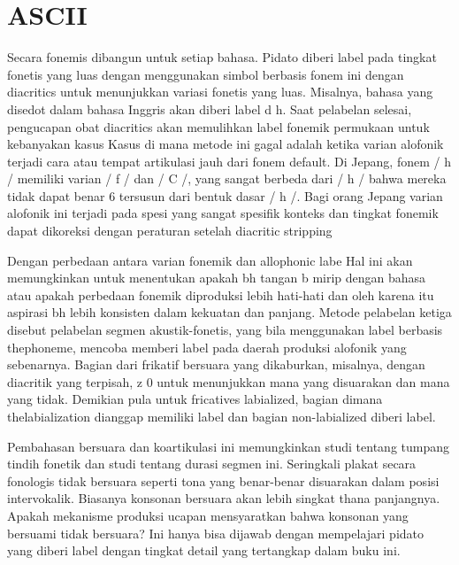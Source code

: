 \section{ASCII}
Secara fonemis dibangun untuk setiap bahasa.
Pidato diberi label pada tingkat fonetis yang luas dengan menggunakan simbol berbasis fonem ini dengan diacritics
untuk menunjukkan variasi fonetis yang luas. Misalnya, bahasa yang disedot dalam bahasa Inggris akan diberi label d h.
Saat pelabelan selesai, pengucapan obat diacritics akan memulihkan label fonemik permukaan
untuk kebanyakan kasus Kasus di mana metode ini gagal adalah ketika varian alofonik terjadi
cara atau tempat artikulasi jauh dari fonem default. Di Jepang, fonem / h /
memiliki varian / f / dan / C /, yang sangat berbeda dari / h / bahwa mereka tidak dapat benar 6
tersusun dari bentuk dasar / h /. Bagi orang Jepang varian alofonik ini terjadi pada spesi yang sangat spesifik
konteks dan tingkat fonemik dapat dikoreksi dengan peraturan setelah diacritic stripping

Dengan perbedaan antara varian fonemik dan allophonic labe Hal ini akan memungkinkan untuk menentukan apakah bh tangan b mirip dengan bahasa atau apakah perbedaan fonemik diproduksi lebih hati-hati dan oleh karena itu aspirasi bh lebih konsisten dalam kekuatan dan panjang. Metode pelabelan ketiga disebut pelabelan segmen akustik-fonetis, yang bila menggunakan label berbasis thephoneme, mencoba memberi label pada daerah produksi alofonik yang sebenarnya. Bagian dari frikatif bersuara yang dikaburkan, misalnya, dengan diacritik yang terpisah, z 0 untuk menunjukkan mana yang disuarakan dan mana yang tidak. Demikian pula untuk fricatives labialized, bagian dimana thelabialization dianggap memiliki label dan bagian non-labialized diberi label. 

Pembahasan bersuara dan koartikulasi ini memungkinkan studi tentang tumpang tindih fonetik dan studi tentang durasi segmen ini. Seringkali plakat secara fonologis tidak bersuara seperti tona yang benar-benar disuarakan dalam posisi intervokalik. Biasanya konsonan bersuara akan lebih singkat thana panjangnya. Apakah mekanisme produksi ucapan mensyaratkan bahwa konsonan yang bersuami tidak bersuara? Ini hanya bisa dijawab dengan mempelajari pidato yang diberi label dengan tingkat detail yang tertangkap dalam buku ini. 